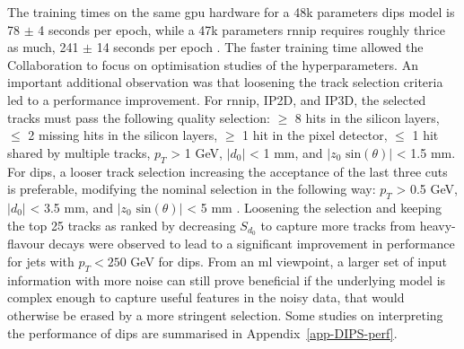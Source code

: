 The training times on the same \gls{gpu} hardware for a 48k parameters \gls{dips} model is 78 $\pm$ 4 seconds per epoch, while a 47k parameters \gls{rnnip} requires roughly thrice as much, 241 $\pm$ 14 seconds per epoch \cite{ATL-PHYS-PUB-2020-014}. The faster training time allowed the Collaboration to focus on optimisation studies of the hyperparameters. An important additional observation was that loosening the track selection criteria led to a performance improvement. For \gls{rnnip}, IP2D, and IP3D, the selected tracks must pass the following quality selection: $\geq$ 8 hits in the silicon layers, $\leq$ 2 missing hits in the silicon layers, $\geq$ 1 hit in the pixel detector, $\leq$ 1 hit shared by multiple tracks, $p_T$ > 1 GeV, $|d_0|$ < 1 mm, and $|z_0 \textrm{ sin}(\theta)|$ < 1.5 mm. For \gls{dips}, a looser track selection increasing the acceptance of the last three cuts is preferable, modifying the nominal selection in the following way: $p_T$ > 0.5 GeV, $|d_0|$ < 3.5 mm, and $|z_0 \textrm{ sin}(\theta)|$ < 5 mm \cite{ATL-PHYS-PUB-2020-014}. Loosening the selection and keeping the top 25 tracks as ranked by decreasing $S_{d_0}$ to capture more tracks from heavy-flavour decays were observed to lead to a significant improvement in performance for jets with $p_T < 250$ GeV for \gls{dips}. From an \gls{ml} viewpoint, a larger set of input information with more noise can still prove beneficial if the underlying model is complex enough to capture useful features in the noisy data, that would otherwise be erased by a more stringent selection. Some studies on interpreting the performance of \gls{dips} are summarised in Appendix~\ref{app-DIPS-perf}. %

